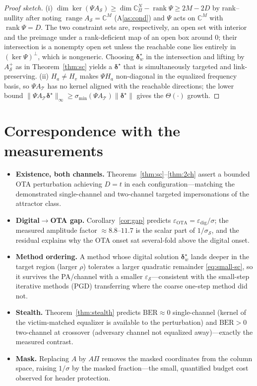 \documentclass[11pt]{article}
\theoremstyle{definition}
\newcommand{\C}{\mathbb{C}}
\newcommand{\norm}[1]{\lVert #1 \rVert}
\newcommand{\bd}{\bm{\delta}}
\newcommand{\smin}{\sigma_{\min}}
\DeclareMathOperator{\rank}{rank}
\DeclareMathOperator{\range}{range}
\begin{document}
\begin{proof}[Proof sketch]
(i) $\dim\ker(\Psi A_{\mathcal S})\ge \dim\C^{N}_{\Pi}-\rank\Psi\ge 2M-2D$ by rank--nullity
after noting $\range A_{\mathcal S}=\C^{M}$ (A\ref{as:cond}) and $\Psi$ acts on $\C^M$ with
$\rank\Psi=D$. The two constraint sets are, respectively, an open set with interior and the
preimage under a rank-deficient map of an open box around $0$; their intersection is a
nonempty open set unless the reachable cone lies entirely in $(\ker\Psi)^{\perp}$, which is
nongeneric. Choosing $\bd_w^\star$ in the intersection and lifting by $A_{\mathcal S}^{+}$ as in
Theorem~\ref{thm:sc} yields a $\bd^\star$ that is simultaneously targeted and link-preserving.
(ii) $H_a\neq H_v$ makes $\Psi H_a$ non-diagonal in the equalized frequency basis, so
$\Psi A_{\mathcal T}$ has no kernel aligned with the reachable directions; the lower bound
$\norm{\Psi A_{\mathcal T}\bd^\star}_\infty\ge\smin(\Psi A_{\mathcal T})\norm{\bd^\star}$ gives
the $\Theta(\cdot)$ growth.
\end{proof}

\section{Correspondence with the measurements}

\begin{itemize}
\item \textbf{Existence, both channels.} Theorems~\ref{thm:sc}--\ref{thm:2ch} assert a bounded
OTA perturbation achieving $D=t$ in each configuration---matching the demonstrated
single-channel and two-channel targeted impersonations of the attractor class.
\item \textbf{Digital$\to$OTA gap.} Corollary~\ref{cor:gap} predicts
$\varepsilon_{\mathrm{OTA}}=\varepsilon_{\mathrm{dig}}/\sigma$; the measured amplitude factor
$\approx 8.8$--$11.7$ is the scalar part of $1/\sigma_{\mathcal S}$, and the residual explains
why the OTA onset sat several-fold above the digital onset.
\item \textbf{Method ordering.} A method whose digital solution $\bd_w^\star$ lands deeper in
the target region (larger $\rho$) tolerates a larger quadratic remainder \eqref{eq:small-sc},
so it survives the PA/channel with a smaller $\varepsilon_{\mathcal S}$---consistent with the
small-step iterative methods (PGD) transferring where the coarse one-step method did not.
\item \textbf{Stealth.} Theorem~\ref{thm:stealth} predicts $\mathrm{BER}\approx0$ single-channel
(kernel of the victim-matched equalizer is available to the perturbation) and $\mathrm{BER}>0$
two-channel at crossover (adversary channel not equalized away)---exactly the measured
contrast.
\item \textbf{Mask.} Replacing $A$ by $A\Pi$ removes the masked coordinates from the column
space, raising $1/\sigma$ by the masked fraction---the small, quantified budget cost observed
for header protection.
\end{itemize}
\end{document}
